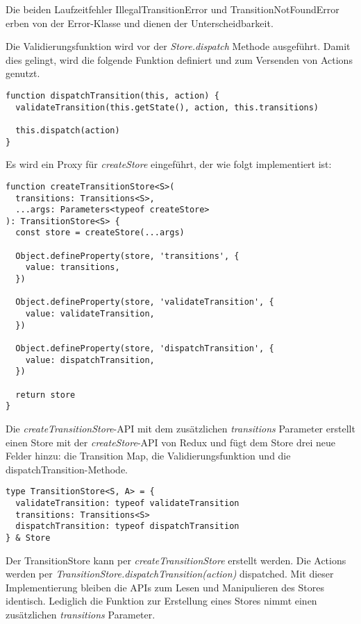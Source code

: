 Die beiden Laufzeitfehler IllegalTransitionError und TransitionNotFoundError erben von der Error-Klasse und dienen der Unterscheidbarkeit.

Die Validierungsfunktion wird vor der \textit{Store.dispatch} Methode ausgeführt. Damit dies gelingt, wird die folgende Funktion definiert und zum Versenden von Actions genutzt.

\begin{lstlisting}
function dispatchTransition(this, action) {
  validateTransition(this.getState(), action, this.transitions)
  
  this.dispatch(action)
}
\end{lstlisting}

Es wird ein Proxy für \textit{createStore} eingeführt, der wie folgt implementiert ist:

\begin{lstlisting}
function createTransitionStore<S>(
  transitions: Transitions<S>,
  ...args: Parameters<typeof createStore>
): TransitionStore<S> {
  const store = createStore(...args)
  
  Object.defineProperty(store, 'transitions', {
    value: transitions,
  })
  
  Object.defineProperty(store, 'validateTransition', {
    value: validateTransition,
  })
  
  Object.defineProperty(store, 'dispatchTransition', {
    value: dispatchTransition,
  })
  
  return store
}
\end{lstlisting}

Die \textit{createTransitionStore}-API mit dem zusätzlichen \textit{transitions} Parameter erstellt einen Store mit der \textit{createStore}-API von Redux und fügt dem Store drei neue Felder hinzu: die Transition Map, die Validierungsfunktion und die dispatchTransition-Methode.

\begin{lstlisting}
type TransitionStore<S, A> = {
  validateTransition: typeof validateTransition
  transitions: Transitions<S>
  dispatchTransition: typeof dispatchTransition
} & Store  
\end{lstlisting}

Der TransitionStore kann per \textit{createTransitionStore} erstellt werden. Die Actions werden per \textit{TransitionStore.dispatchTransition(action)} dispatched. Mit dieser Implementierung bleiben die APIs zum Lesen und Manipulieren des Stores identisch. Lediglich die Funktion zur Erstellung eines Stores nimmt einen zusätzlichen \textit{transitions} Parameter.

